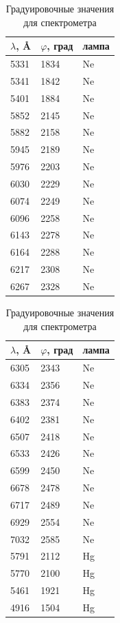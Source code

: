 \documentclass[a4paper,12pt]{article}
\begin{document}
\begin{table}[!h]
    \centering
    \begin{minipage}{0.48\textwidth}
        \centering
        \begin{tabular}{l|l|l}
            \hline
            $\lambda$, \AA & $\varphi$, град & лампа \\ \hline
            5331 & 1834 & Ne \\
            5341 & 1842 & Ne \\
            5401 & 1884 & Ne \\
            5852 & 2145 & Ne \\
            5882 & 2158 & Ne \\
            5945 & 2189 & Ne \\
            5976 & 2203 & Ne \\
            6030 & 2229 & Ne \\
            6074 & 2249 & Ne \\
            6096 & 2258 & Ne \\
            6143 & 2278 & Ne \\
            6164 & 2288 & Ne \\
            6217 & 2308 & Ne \\
            6267 & 2328 & Ne \\ \hline
        \end{tabular}
    \end{minipage}%
    \hfill
    \begin{minipage}{0.48\textwidth}
        \centering
        \begin{tabular}{l|l|l}
            \hline
            $\lambda$, \AA & $\varphi$, град & лампа \\ \hline
            6305 & 2343 & Ne \\
            6334 & 2356 & Ne \\
            6383 & 2374 & Ne \\
            6402 & 2381 & Ne \\
            6507 & 2418 & Ne \\
            6533 & 2426 & Ne \\
            6599 & 2450 & Ne \\
            6678 & 2478 & Ne \\
            6717 & 2489 & Ne \\
            6929 & 2554 & Ne \\
            7032 & 2585 & Ne \\
            5791 & 2112 & Hg \\
            5770 & 2100 & Hg \\
            5461 & 1921 & Hg \\
            4916 & 1504 & Hg \\ \hline
        \end{tabular}
    \end{minipage}
    \caption{Градуировочные значения для спектрометра}
    \label{table:grad}
\end{table}
\end{document}
